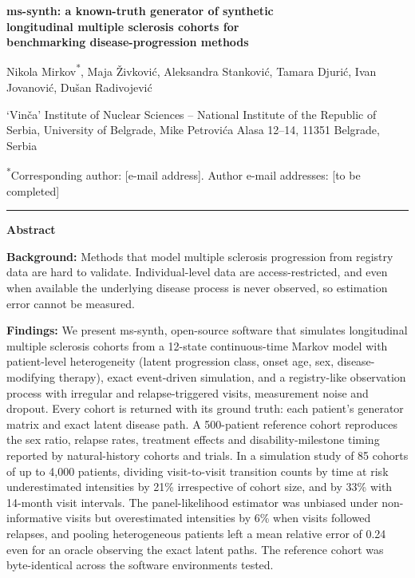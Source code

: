 \documentclass[11pt,a4paper]{article}
\begin{document}
\linenumbers

\begin{center}
{\LARGE\bfseries ms-synth: a known-truth generator of synthetic\\[3pt]
longitudinal multiple sclerosis cohorts for\\[3pt] benchmarking disease-progression methods}

\vspace{12pt}
{\normalsize Nikola Mirkov\textsuperscript{*}, Maja \v{Z}ivkovi\'{c}, Aleksandra Stankovi\'{c}, Tamara Djuri\'{c}, Ivan Jovanovi\'{c}, Du\v{s}an Radivojevi\'{c}}

\vspace{4pt}
{\small `Vin\v{c}a' Institute of Nuclear Sciences -- National Institute of the Republic of Serbia, University of Belgrade, Mike Petrovi\'{c}a Alasa 12--14, 11351 Belgrade, Serbia}

\vspace{4pt}
{\small \textsuperscript{*}Corresponding author: [e-mail address]. Author e-mail addresses: [to be completed]}
\end{center}

\vspace{6pt}\hrule\vspace{8pt}

\noindent\textbf{Abstract}

\noindent\textbf{Background:}
Methods that model multiple sclerosis progression from registry data are hard to validate. Individual-level data are access-restricted, and even when available the underlying disease process is never observed, so estimation error cannot be measured.

\noindent\textbf{Findings:}
We present ms-synth, open-source software that simulates longitudinal multiple sclerosis cohorts from a 12-state continuous-time Markov model with patient-level heterogeneity (latent progression class, onset age, sex, disease-modifying therapy), exact event-driven simulation, and a registry-like observation process with irregular and relapse-triggered visits, measurement noise and dropout. Every cohort is returned with its ground truth: each patient's generator matrix and exact latent disease path. A 500-patient reference cohort reproduces the sex ratio, relapse rates, treatment effects and disability-milestone timing reported by natural-history cohorts and trials. In a simulation study of 85 cohorts of up to 4,000 patients, dividing visit-to-visit transition counts by time at risk underestimated intensities by 21\% irrespective of cohort size, and by 33\% with 14-month visit intervals. The panel-likelihood estimator was unbiased under non-informative visits but overestimated intensities by 6\% when visits followed relapses, and pooling heterogeneous patients left a mean relative error of 0.24 even for an oracle observing the exact latent paths. The reference cohort was byte-identical across the software environments tested.
\end{document}
